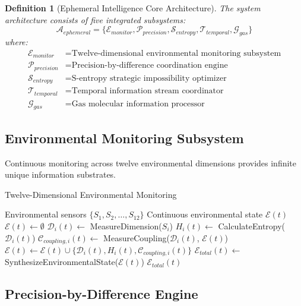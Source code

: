 \documentclass[12pt,a4paper]{article}
\newtheorem{definition}{Definition}
\begin{document}
\begin{definition}[Ephemeral Intelligence Core Architecture]
The system architecture consists of five integrated subsystems:
\begin{equation}
\mathcal{A}_{ephemeral} = \{\mathcal{E}_{monitor}, \mathcal{P}_{precision}, \mathcal{S}_{entropy}, \mathcal{T}_{temporal}, \mathcal{G}_{gas}\}
\end{equation}
where:
\begin{align}
\mathcal{E}_{monitor} &= \text{Twelve-dimensional environmental monitoring subsystem} \\
\mathcal{P}_{precision} &= \text{Precision-by-difference coordination engine} \\
\mathcal{S}_{entropy} &= \text{S-entropy strategic impossibility optimizer} \\
\mathcal{T}_{temporal} &= \text{Temporal information stream coordinator} \\
\mathcal{G}_{gas} &= \text{Gas molecular information processor}
\end{align}
\end{definition}

\subsection{Environmental Monitoring Subsystem}

Continuous monitoring across twelve environmental dimensions provides infinite unique information substrates.

\begin{algorithm}
\caption{Twelve-Dimensional Environmental Monitoring}
\begin{algorithmic}[1]
\Require Environmental sensors $\{S_1, S_2, \ldots, S_{12}\}$
\Ensure Continuous environmental state $\mathcal{E}(t)$
\State $\mathcal{E}(t) \leftarrow \emptyset$
    \State $\mathcal{D}_i(t) \leftarrow$ MeasureDimension($S_i$)
    \State $H_i(t) \leftarrow$ CalculateEntropy($\mathcal{D}_i(t)$)
    \State $\mathcal{C}_{coupling,i}(t) \leftarrow$ MeasureCoupling($\mathcal{D}_i(t)$, $\mathcal{E}(t)$)
    \State $\mathcal{E}(t) \leftarrow \mathcal{E}(t) \cup \{\mathcal{D}_i(t), H_i(t), \mathcal{C}_{coupling,i}(t)\}$
\EndFor
\State $\mathcal{E}_{total}(t) \leftarrow$ SynthesizeEnvironmentalState($\mathcal{E}(t)$)
\State \Return $\mathcal{E}_{total}(t)$
\end{algorithmic}
\end{algorithm}

\subsection{Precision-by-Difference Engine}
\end{document}
